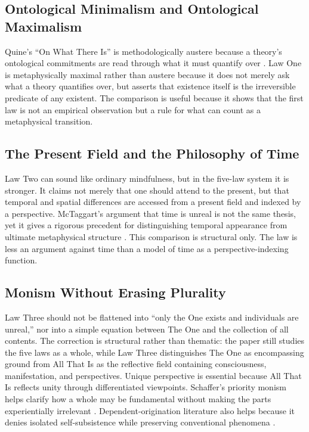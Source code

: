 \documentclass[11pt]{article}
\begin{document}
\subsection{Ontological Minimalism and Ontological Maximalism}

Quine's ``On What There Is'' is methodologically austere because a theory's ontological commitments are read through what it must quantify over \cite{Quine1948}.  Law One is metaphysically maximal rather than austere because it does not merely ask what a theory quantifies over, but asserts that existence itself is the irreversible predicate of any existent.  The comparison is useful because it shows that the first law is not an empirical observation but a rule for what can count as a metaphysical transition.

\subsection{The Present Field and the Philosophy of Time}

Law Two can sound like ordinary mindfulness, but in the five-law system it is stronger.  It claims not merely that one should attend to the present, but that temporal and spatial differences are accessed from a present field and indexed by a perspective.  McTaggart's argument that time is unreal is not the same thesis, yet it gives a rigorous precedent for distinguishing temporal appearance from ultimate metaphysical structure \cite{McTaggart1908}.  This comparison is structural only.  The law is less an argument against time than a model of time as a perspective-indexing function.

\subsection{Monism Without Erasing Plurality}

Law Three should not be flattened into ``only the One exists and individuals are unreal,'' nor into a simple equation between The One and the collection of all contents.  The correction is structural rather than thematic: the paper still studies the five laws as a whole, while Law Three distinguishes The One as encompassing ground from All That Is as the reflective field containing consciousness, manifestation, and perspectives.  Unique perspective is essential because All That Is reflects unity through differentiated viewpoints.  Schaffer's priority monism helps clarify how a whole may be fundamental without making the parts experientially irrelevant \cite{Schaffer2010}.  Dependent-origination literature also helps because it denies isolated self-subsistence while preserving conventional phenomena \cite{Garfield1995,Gethin1998}.
\end{document}

